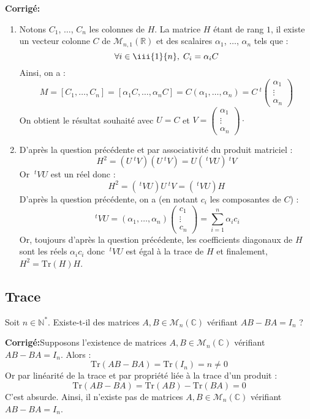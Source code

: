 \documentclass[a4paper,twoside,french,11pt]{VcCours}
\newcommand{\corr}{\textbf{Corrigé:}}
\begin{document}
\corr 

\begin{enumerate}
\item Notons $C_1$, $\ldots$, $C_n$ les colonnes de $H$. La matrice $H$ étant de rang $1$, il existe un vecteur colonne $C$ de $\mathcal{M}_{n,1}(\mathbb{R})$ et des scalaires $\alpha_1$, $\ldots$, $\alpha_n$ tels que :
$$ \forall i \in \iii{1}{n}, \; C_i =\alpha_i C $$
Ainsi, on a :
$$ M = [C_1, \ldots, C_n] = [\alpha_1 C, \ldots, \alpha_n C] = C (\alpha_1, \ldots, \alpha_n) = C~^t \begin{pmatrix}
\alpha_1 \\
\vdots \\
\alpha_n
\end{pmatrix}$$
On obtient le résultat souhaité avec $U=C$ et $V = \begin{pmatrix}
\alpha_1 \\
\vdots \\
\alpha_n
\end{pmatrix} \cdot$
\item D'après la question précédente et par associativité du produit matriciel :
$$ H^2 = (U ~^tV) (U ~^tV) = U( ~^tVU )~^tV$$
Or $~^tVU$ est un réel donc :
$$ H^2 = (~^tVU ) U ~^tV =  (~^tVU ) H$$
D'après la question précédente, on a (en notant $c_i$ les composantes de $C$) :
$$ ~^tVU  = (\alpha_1, \ldots, \alpha_n) \begin{pmatrix}
c_1 \\
\vdots \\
c_n
\end{pmatrix} = \sum_{i=1}^n \alpha_i c_i $$
Or, toujours d'après la question précédente, les coefficients diagonaux de $H$ sont les réels $\alpha_i c_i$ donc $~^tVU $ est égal à la trace de $H$ et finalement, $H^2 = \textrm{Tr}(H)H$.
\end{enumerate}
 

\subsection{\large Trace}




\begin{Exercice}{} Soit $n \in \mathbb{N}^*$. Existe-t-il des matrices $A,B \in \mathcal{M}_n(\mathbb{C})$ vérifiant $AB - BA = I_n$ ?
\end{Exercice}

\corr Supposons l'existence de matrices $A,B \in \mathcal{M}_n(\mathbb{C})$ vérifiant $AB - BA = I_n$. Alors :
$$ \textrm{Tr}(AB-BA) = \textrm{Tr}(I_n) = n \neq 0$$
Or par linéarité de la trace et par propriété liée à la trace d'un produit :
$$  \textrm{Tr}(AB-BA) =  \textrm{Tr}(AB)- \textrm{Tr}(BA) = 0$$
C'est absurde. Ainsi, il n'existe pas de matrices $A,B \in \mathcal{M}_n(\mathbb{C})$ vérifiant $AB - BA = I_n$.
\end{document}
